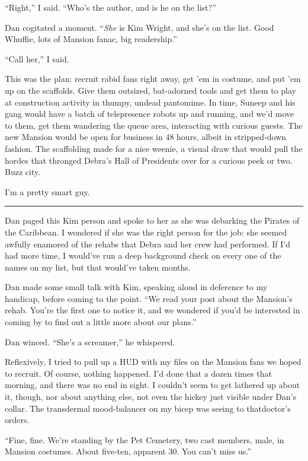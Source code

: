 “Right,” I said. “Who's the author, and is he on the list?”

Dan cogitated a moment. “\emph{She} is Kim Wright, and she's on the
list. Good Whuffie, lots of Mansion fanac, big readership.”

“Call her,” I said.

This was the plan: recruit rabid fans right away, get 'em in
costume, and put 'em up on the scaffolds. Give them outsized,
bat-adorned tools and get them to play at construction activity in
thumpy, undead pantomime. In time, Suneep and his gang would have a
batch of telepresence robots up and running, and we'd move to them,
get them wandering the queue area, interacting with curious guests.
The new Mansion would be open for business in 48 hours, albeit in
stripped-down fashion. The scaffolding made for a nice weenie, a
visual draw that would pull the hordes that thronged Debra's Hall
of Presidents over for a curious peek or two. Buzz city.

I'm a pretty smart guy.

\begin{center}\rule{3in}{0.4pt}\end{center}

Dan paged this Kim person and spoke to her as she was debarking the
Pirates of the Caribbean. I wondered if she was the right person
for the job: she seemed awfully enamored of the rehabs that Debra
and her crew had performed. If I'd had more time, I would've run a
deep background check on every one of the names on my list, but
that would've taken months.

Dan made some small talk with Kim, speaking aloud in deference to
my handicap, before coming to the point. “We read your post about
the Mansion's rehab. You're the first one to notice it, and we
wondered if you'd be interested in coming by to find out a little
more about our plans.”

Dan winced. “She's a screamer,” he whispered.

Reflexively, I tried to pull up a HUD with my files on the Mansion
fans we hoped to recruit. Of course, nothing happened. I'd done
that a dozen times that morning, and there was no end in sight. I
couldn't seem to get lathered up about it, though, nor about
anything else, not even the hickey just visible under Dan's collar.
The transdermal mood-balancer on my bicep was seeing to
that{\dash}doctor's orders.

“Fine, fine. We're standing by the Pet Cemetery, two cast members,
male, in Mansion costumes. About five-ten, apparent 30. You can't
miss us.”

